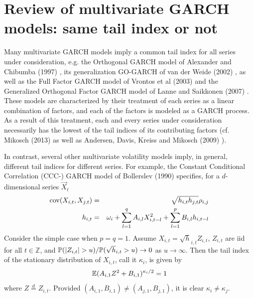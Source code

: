 \documentclass{article}
\begin{document}
\section{Review of multivariate GARCH models: same tail index or not}
Many multivariate GARCH models imply a common tail index for all
series under consideration, e.g. the Orthogonal GARCH model of
Alexander and Chibumba (1997) \cite{alexander1997multivariate}, its
generalization GO-GARCH of van der Weide (2002) \cite{van2002go}, as
well as the Full Factor GARCH model of Vrontos et al (2003)
\cite{vrontos2003full} and the Generalized Orthogonal Factor GARCH
model of Lanne and Saikkonen (2007) \cite{lanne2007modeling}. These
models are characterized by their treatment of each series as a linear
combination of factors, and each of the factors is modeled as a GARCH
process. As a result of this treatment, each and every series under
consideration necessarily has the lowest of the tail indices of its
contributing factors (cf. Mikosch (2013) \cite{Mikosch2013} as well
as Andersen, Davis, Kreiss and Mikosch (2009)
\cite{andersen2009handbook}).

In contrast, several other multivariate volatility models imply, in
general, different tail indices for different series. For example, the
Constant Conditional Correlation (CCC-) GARCH model of Bollerslev
(1990) \cite{bollerslev1990modelling} specifies, for a $d$-dimensional
series $\vec X_t$
\begin{eqnarray}
  \cov(X_{i,t}, X_{j,t}) &=& \sqrt{h_{i,t} h_{j,t}} \rho_{i,j}
  \nonumber \\
  h_{i,t} &=& \omega_i + \sum_{l=1}^q A_{i,l} X_{i, t-l}^2 +
  \sum_{l=1}^p B_{i,l} h_{i, t-l} \label{eq:CCC-GARCH}
\end{eqnarray}
Consider the simple case when $p=q=1$. Assume
$X_{i, t} = \sqrt h_{i,t} Z_{i,t}$, $Z_{i, t}$ are iid for
all $t \in \mathbb Z$, and $\P(|Z_{i,t}| > u)/\P(\sqrt h_{i,t} > u) \to 0$ as
$u \to \infty$. Then the tail index of the stationary distribution of
$X_{i,t}$, call it $\kappa_i$, is given by
\[
\E (A_{i, 1} Z^2 + B_{i, 1})^{\kappa_i / 2} = 1
\]
where $Z \overset{d}{=} Z_{i,t}$.
Provided $(A_{i,1}, B_{i,1}) \neq (A_{j,1}, B_{j,1})$, it is clear
$\kappa_i \neq \kappa_j$.
\end{document}
